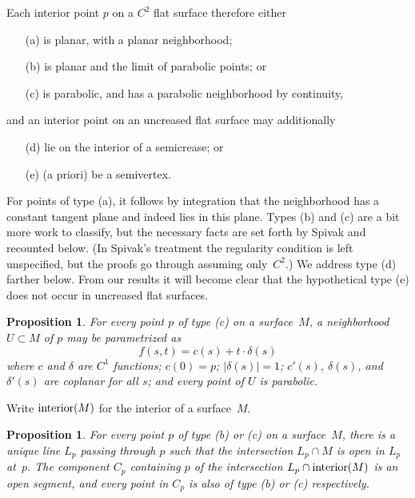\documentclass[11pt,letterpaper]{article}
\newtheorem{proposition}[theorem]{Proposition}
\newcommand\interior{\mathop{\rm interior}}
\begin{document}
Each interior point $p$ on a $C^2$ flat surface therefore either
\begin{enumerate}
\item[(a)] is planar, with a planar neighborhood;
\item[(b)] is planar and the limit of parabolic points; or
\item[(c)] is parabolic, and has a parabolic neighborhood by continuity,
\end{enumerate}
and an interior point on an uncreased flat surface may additionally
\begin{enumerate}
\item[(d)] lie on the interior of a semicrease; or
\item[(e)] (a priori) be a semivertex.
\end{enumerate}

For points of type (a), it follows by integration that the
neighborhood has a constant tangent plane and indeed lies in this
plane.  Types (b) and (c) are a bit more work to classify, but the
necessary facts are set forth by
Spivak \cite[vol.~3, chap.~5, pp.~349--362]{Spivak-1979}
and recounted below.
(In Spivak's treatment the regularity condition is left unspecified,
but the proofs go through assuming only~$C^2$.)
We address type (d) farther below.  From our results it will become clear that
the hypothetical type (e) does not occur in uncreased flat surfaces.

\begin{proposition}
  {\rm \cite[Proposition III.5.4 et seq.]{Spivak-1979}} \label{prp:1}
  For every point $p$ of type (c) on a surface~$M$, a
  neighborhood $U \subset M$ of $p$ may be parametrized as
  $$ f(s,t) = c(s) + t \cdot \delta(s) $$
  where $c$ and $\delta$ are $C^1$ functions; $c(0) = p$;
  $|\delta(s)| = 1$; $c'(s)$, $\delta(s)$, and $\delta'(s)$ are coplanar
  for all $s$; and every point of $U$ is parabolic.
\end{proposition}

Write $\interior(M)$ for the interior of a surface~$M$.

\begin{proposition}
  {\rm \cite[Corollaries III.5.6--7]{Spivak-1979}} \label{prp:2}
  For every point $p$ of type (b) or (c) on a surface~$M$,
  there is a unique line $L_p$ passing through $p$ such that
  the intersection $L_p \cap M$ is open in $L_p$ at~$p$.
  The component $C_p$ containing $p$ of the
  intersection $L_p \cap \interior(M)$ is an open segment,
  and every point in $C_p$ is also of type (b) or (c) respectively.
\end{proposition}
\end{document}
